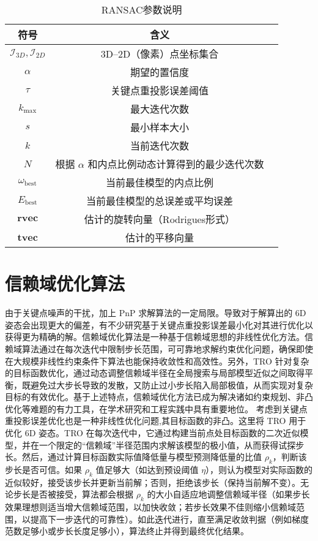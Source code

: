 \begin{table}[h!]
	\centering
	\caption{RANSAC参数说明}
	\label{tab:ransac_params}
	\begin{tabular}{ccp{8cm}}
		\toprule
		符号 & 含义\\
		\midrule
		$\mathcal{I}_{3D}, \mathcal{I}_{2D}$ & 3D--2D（像素）点坐标集合 \\
		$\alpha$ & 期望的置信度 \\
		$\tau$ & 关键点重投影误差阈值 \\
		$k_{\max}$ & 最大迭代次数 \\
		$s$ & 最小样本大小 \\
		$k$ & 当前迭代次数 \\
		$N$ & 根据 $\alpha$ 和内点比例动态计算得到的最少迭代次数 \\
		$\omega_{\text{best}}$ & 当前最佳模型的内点比例 \\
		$E_{\text{best}}$ & 当前最佳模型的总误差或平均误差 \\
		$\mathbf{rvec}$ & 估计的旋转向量（Rodrigues形式） \\
		$\mathbf{tvec}$ & 估计的平移向量 \\
		\bottomrule
	\end{tabular}
\end{table}










\section{信赖域优化算法}

由于关键点噪声的干扰，加上 PnP 求解算法的一定局限。导致对于解算出的 6D 姿态会出现更大的偏差，有不少研究基于关键点重投影误差最小化对其进行优化以获得更为精确的解\cite{10297555,guo2024joint}。信赖域优化算法是一种基于信赖域思想的非线性优化方法。信赖域算法通过在每次迭代中限制步长范围，可可靠地求解约束优化问题，确保即使在大规模非线性约束条件下算法也能保持收敛性和高效性​\cite{wen2024augmented}。另外，TRO 针对复杂的目标函数优化，通过动态调整信赖域半径在全局搜索与局部模型近似之间取得平衡，既避免过大步长导致的发散，又防止过小步长陷入局部极值，从而实现对复杂目标的有效优化​\cite{asmtr}。基于上述特点，信赖域优化方法已成为解决诸如约束规划、非凸优化等难题的有力工具，在学术研究和工程实践中具有重要地位。
考虑到关键点重投影误差优化也是一种非线性优化问题,其目标函数的非凸。这里将 TRO 用于优化 6D 姿态。TRO 在每次迭代中，它通过构建当前点处目标函数的二次近似模型，并在一个限定的“信赖域”半径范围内求解该模型的极小值，从而获得试探步长。然后，通过计算目标函数实际值降低量与模型预测降低量的比值 $\rho_k$，判断该步长是否可信。如果 $\rho_k$ 值足够大（如达到预设阈值 $\eta$），则认为模型对实际函数的近似较好，接受该步长并更新当前解；否则，拒绝该步长（保持当前解不变）。无论步长是否被接受，算法都会根据 $\rho_k$ 的大小自适应地调整信赖域半径（如果步长效果理想则适当增大信赖域范围，以加快收敛；若步长效果不佳则缩小信赖域范围，以提高下一步迭代的可靠性）。如此迭代进行，直至满足收敛判据（例如梯度范数足够小或步长长度足够小），算法终止并得到最终优化结果。


